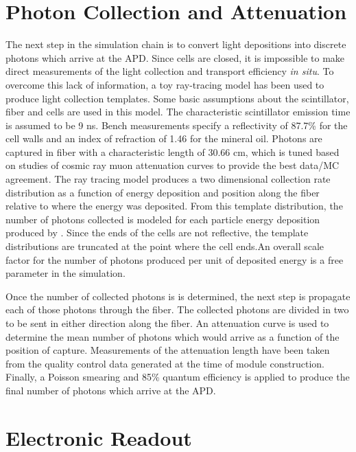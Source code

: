\section{Photon Collection and Attenuation}
\label{photoncoll}

The next step in the simulation chain is to convert light depositions into discrete photons which arrive at the APD.  Since \nova cells are closed, it is impossible to make direct measurements of the light collection and transport efficiency \textit{in situ}.  To overcome this lack of information, a toy ray-tracing model has been used to produce light collection templates.  Some basic assumptions about the scintillator, fiber and cells are used in this model.  The characteristic scintillator emission time is assumed to be 9 ns.  Bench measurements specify a reflectivity of 87.7\% for the cell walls and an index of refraction of 1.46 for the mineral oil.  Photons are captured in fiber with a characteristic length of 30.66 cm, which is tuned based on studies of cosmic ray muon attenuation curves to provide the best data/MC agreement.  The ray tracing model produces a two dimensional collection rate  distribution as a function of energy deposition and position along the fiber relative to where the energy was deposited.  From this template distribution, the number of photons collected is modeled for each particle energy deposition produced by \geant.  Since the ends of the cells are not reflective, the template distributions are truncated at the point where the cell ends.An overall scale factor for the number of photons produced per unit of deposited energy is a free parameter in the simulation.

Once the number of collected photons is is determined, the next step is propagate each of those photons through the fiber.  The collected photons are divided in two to be sent in either direction along the fiber.  An attenuation curve is used to determine the mean number of photons which would arrive as a function of the position of capture.  Measurements of the attenuation length have been taken from the quality control data generated at the time of module construction.  Finally, a Poisson smearing and 85\% quantum efficiency is applied to produce the final number of photons which arrive at the APD.

\section{Electronic Readout}


